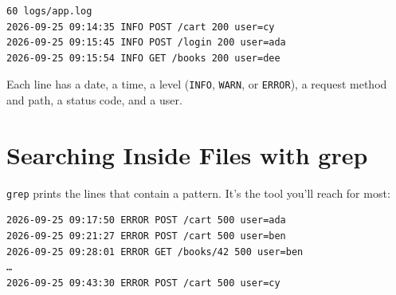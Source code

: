 \begin{codeblock}

\begin{Shaded}
\begin{Highlighting}[]
 
 
\end{Highlighting}
\end{Shaded}

\end{codeblock}

\begin{codeblock}
\begin{Verbatim}[formatcom=\outputstyle]
60 logs/app.log
2026-09-25 09:14:35 INFO POST /cart 200 user=cy
2026-09-25 09:15:45 INFO POST /login 200 user=ada
2026-09-25 09:15:54 INFO GET /books 200 user=dee
\end{Verbatim}
\end{codeblock}

Each line has a date, a time, a level (\texttt{INFO}, \texttt{WARN}, or \texttt{ERROR}), a request method and path, a status code, and a user.


\section{Searching Inside Files with grep}\label{05-the-everyday-command-line:searching-inside-files-with-grep}

\texttt{grep} prints the lines that contain a pattern. It's the tool you'll reach for most:

\begin{codeblock}

\begin{Shaded}
\begin{Highlighting}[]
\end{Highlighting}
\end{Shaded}

\end{codeblock}

\begin{codeblock}
\begin{Verbatim}[formatcom=\outputstyle]
2026-09-25 09:17:50 ERROR POST /cart 500 user=ada
2026-09-25 09:21:27 ERROR POST /cart 500 user=ben
2026-09-25 09:28:01 ERROR GET /books/42 500 user=ben
…
2026-09-25 09:43:30 ERROR POST /cart 500 user=cy
\end{Verbatim}
\end{codeblock}

